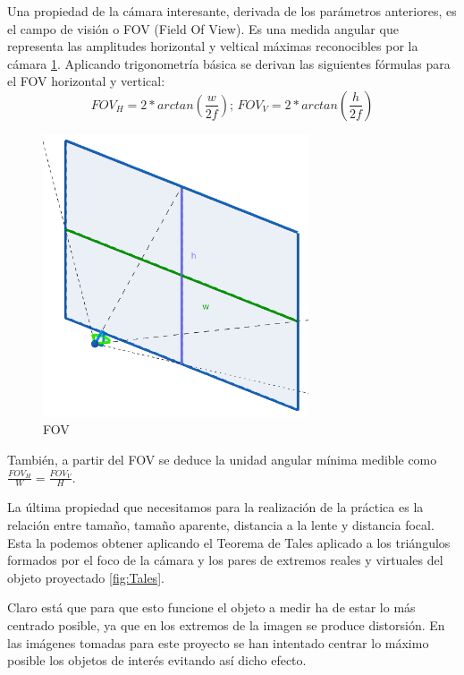 \documentclass[12pt]{article}
\begin{document}
Una propiedad de la cámara interesante, derivada de los parámetros anteriores, es el campo de visión o FOV (Field Of View). 
Es una medida angular que representa las amplitudes horizontal y veltical máximas reconocibles por la cámara \ref{fig:Modelo_fov}.
Aplicando trigonometría básica se derivan las siguientes fórmulas para el FOV horizontal y vertical:
$$ FOV_H = 2*arctan \left( \frac{w}{2f} \right) \text{;     } FOV_V = 2*arctan \left( \frac{h}{2f} \right)$$ 
\begin{figure}[h!]
    \centering
    \includegraphics[width=0.7\textwidth]{images_calibracion/Modelo_fov.png}  %
    \caption{FOV}
    \label{fig:Modelo_fov}
\end{figure}
También, a partir del FOV se deduce la unidad angular mínima medible como $\frac{FOV_H}{W} = \frac{FOV_V}{H}$.

La última propiedad que necesitamos para la realización de la práctica es la relación entre tamaño, tamaño aparente, distancia a la lente y distancia focal.
Esta la podemos obtener aplicando el Teorema de Tales aplicado a los triángulos formados por el foco de la cámara y los pares de extremos reales y virtuales del objeto proyectado \ref{fig:Tales}. 

Claro está que para que esto funcione el objeto a medir ha de estar lo más centrado posible, ya que en los extremos de la imagen se produce distorsión. En las imágenes tomadas para este proyecto se han intentado centrar lo máximo posible los objetos de interés evitando así dicho efecto.
\end{document}

